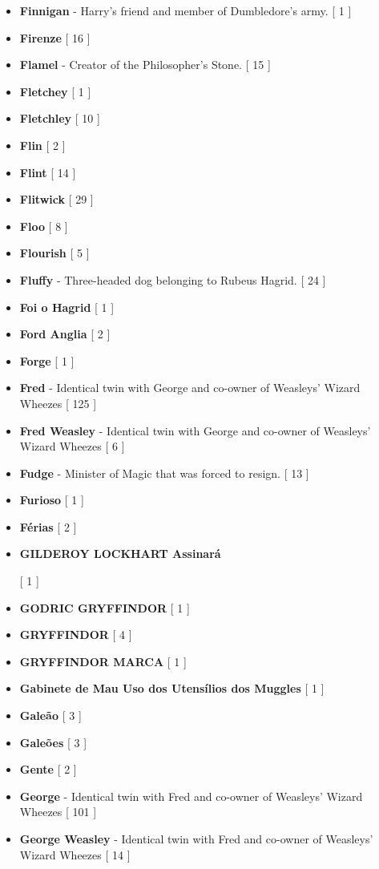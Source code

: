 \documentclass[a4paper]{article}
\begin{document}
\begin{itemize}
	\item \textbf{Finnigan} - Harry's friend and member of Dumbledore's army. [ 1 ]
	\item \textbf{Firenze} [ 16 ]
	\item \textbf{Flamel} - Creator of the Philosopher's Stone. [ 15 ]
	\item \textbf{Fletchey} [ 1 ]
	\item \textbf{Fletchley} [ 10 ]
	\item \textbf{Flin} [ 2 ]
	\item \textbf{Flint} [ 14 ]
	\item \textbf{Flitwick} [ 29 ]
	\item \textbf{Floo} [ 8 ]
	\item \textbf{Flourish} [ 5 ]
	\item \textbf{Fluffy} - Three-headed dog belonging to Rubeus Hagrid. [ 24 ]
	\item \textbf{Foi o Hagrid} [ 1 ]
	\item \textbf{Ford Anglia} [ 2 ]
	\item \textbf{Forge} [ 1 ]
	\item \textbf{Fred} - Identical twin with George and co-owner of Weasleys' Wizard Wheezes [ 125 ]
	\item \textbf{Fred Weasley} - Identical twin with George and co-owner of Weasleys' Wizard Wheezes [ 6 ]
	\item \textbf{Fudge} - Minister of Magic that was forced to resign. [ 13 ]
	\item \textbf{Furioso} [ 1 ]
	\item \textbf{Férias} [ 2 ]
	\item \hypertarget{G}{\textbf{GILDEROY LOCKHART Assinará}} [ 1 ]
	\item \textbf{GODRIC GRYFFINDOR} [ 1 ]
	\item \textbf{GRYFFINDOR} [ 4 ]
	\item \textbf{GRYFFINDOR MARCA} [ 1 ]
	\item \textbf{Gabinete de Mau Uso dos Utensílios dos Muggles} [ 1 ]
	\item \textbf{Galeão} [ 3 ]
	\item \textbf{Galeões} [ 3 ]
	\item \textbf{Gente} [ 2 ]
	\item \textbf{George} - Identical twin with Fred and co-owner of Weasleys' Wizard Wheezes [ 101 ]
	\item \textbf{George Weasley} - Identical twin with Fred and co-owner of Weasleys' Wizard Wheezes [ 14 ]

\end{itemize}
\end{document}
